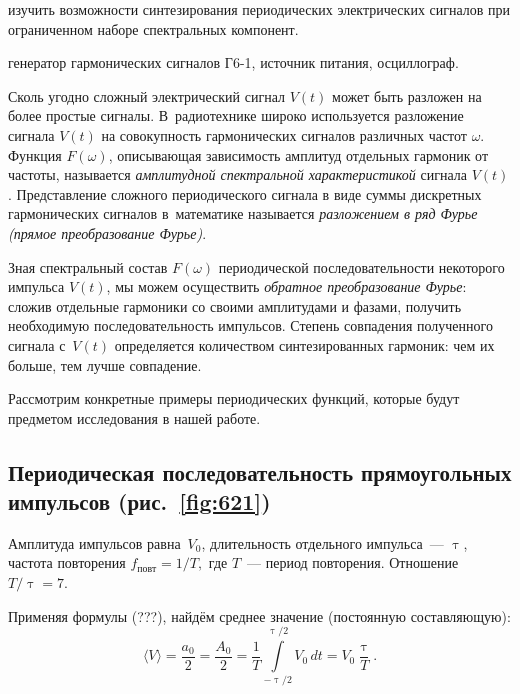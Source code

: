 \setcounter{figure}{0}
\setcounter{equation}{0}

\begin{lab:aim}
	изучить возможности синтезирования периодических электрических сигналов при ограниченном наборе спектральных
компонент.
\end{lab:aim}

\begin{lab:equipment}
	генератор гармонических сигналов Г6-1, источник питания, осциллограф.
\end{lab:equipment}

Сколь угодно сложный электрический сигнал $V(t)$ может быть разложен на более простые сигналы. В~радиотехнике широко используется разложение сигнала $V(t)$ на совокупность гармонических сигналов различных частот $\omega$. Функция $F(\omega)$, описывающая зависимость амплитуд отдельных гармоник от частоты, называется \emph{амплитудной спектральной характеристикой} сигнала $V(t)$. Представление сложного периодического сигнала в виде суммы дискретных гармонических сигналов в~математике называется \emph{разложением в ряд Фурье (прямое преобразование Фурье)}.

Зная спектральный состав $F(\omega)$ периодической последовательности некоторого импульса $V(t)$, мы можем осуществить \emph{обратное преобразование Фурье}: сложив отдельные гармоники со своими амплитудами и фазами, получить необходимую последовательность импульсов. Степень совпадения полученного сигнала с~$V(t)$ определяется количеством синтезированных гармоник: чем их больше, тем лучше совпадение.

Рассмотрим конкретные примеры периодических функций, которые будут предметом исследования в нашей работе.

\subsection*{Периодическая последовательность прямоугольных импульсов (рис.~\ref{fig:621})}
Амплитуда импульсов равна~$V_0$, длительность отдельного импульса~--- $\uptau$, частота повторения $f_{повт}=1/T,$ где $T$~--- период повторения. Отношение $T/\uptau=7$.

Применяя формулы (???),
найдём среднее значение (постоянную составляющую):
\begin{equation}
\langle V \rangle = \frac{a_0}{2} = \frac{A_0}{2} = \frac{1}{T}\int\limits_{-\uptau/2}^{\uptau/2} \!V_0\,dt = V_0 \frac{\uptau}{T}.
\end{equation}


